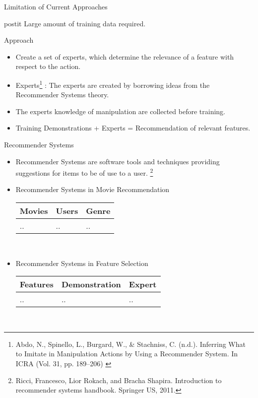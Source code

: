 \documentclass[mathserif,serif]{beamer}
\begin{document}
\begin{frame}{Limitation of Current Approaches}
\begin{beamercolorbox}[sep=1em]{postit}
	Large amount of training data required.
\end{beamercolorbox}
\end{frame}
\begin{frame}{Approach}
    \begin{itemize}
	\item Create a set of experts, which determine the relevance of a feature with respect to the action.
	\item Experts\footnote{\tiny{Abdo, N., Spinello, L., Burgard, W., \& Stachniss, C. (n.d.). Inferring What to Imitate in Manipulation Actions by Using a Recommender System. In ICRA (Vol. 31, pp. 189–206) }} : The experts are created by borrowing ideas from the Recommender Systems theory.
	    \item The experts knowledge of manipulation are collected before training.
	    \item Training Demonstrations + Experts = Recommendation of relevant features.
\end{itemize}
\end{frame}
\begin{frame}{Recommender Systems }
    \begin{itemize}
	\item Recommender Systems are software tools and techniques providing suggestions for items to be of use to a user. \footnote{\tiny{Ricci, Francesco, Lior Rokach, and Bracha Shapira. Introduction to recommender systems handbook. Springer US, 2011.}}
	\item Recommender Systems in Movie Recommendation\\
	{\centering
	\begin{tabular}{|l|l|l|}
    \hline
	    Movies & Users & Genre\\
    \hline
	    .. & .. & ..\\
    \hline
    \end{tabular}\\}
    
    \item Recommender Systems in Feature Selection\\
	{\centering
	\begin{tabular}{|l|l|l|}
    \hline
	    Features & Demonstration & Expert\\
    \hline
	    .. & .. & ..\\
    \hline
    \end{tabular}\\}

\end{itemize}
\end{frame}
\end{document}
